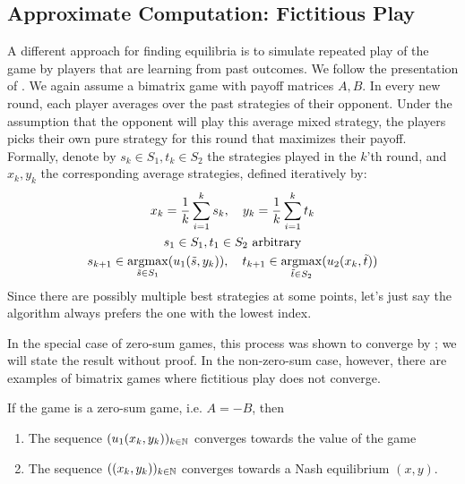\documentclass[a4paper]{scrreprt}
\begin{document}
    \subsection{Approximate Computation: Fictitious Play}
    A different approach for finding equilibria is to simulate repeated play of the game by players that are learning from past outcomes.
    We follow the presentation of \cite{bib:daskalakisFictitiousPlayLectureNotes}.
    We again assume a bimatrix game with payoff matrices $A, B$.
    In every new round, each player averages over the past strategies of their opponent. Under the assumption that the opponent will play this average mixed strategy, the players picks their own pure strategy for this round that maximizes their payoff. Formally, denote by $s_k \in S_1, t_k \in S_2$ the strategies played in the $k$'th round, and $x_k, y_k$ the corresponding average strategies, defined iteratively by:
    \begin{gather*}
        x_k = \frac{1}{k} \sum_{i=1}^{k} s_k, \quad y_k = \frac{1}{k} \sum_{i=1}^{k} t_k \\
        s_1 \in S_1, t_1 \in S_2 \text{ arbitrary} \\
        s_{k+1} \in \mathop{\argmax}\limits_{\tilde{s} \in S_1} (u_1(\tilde{s}, y_k)), \quad %
        t_{k+1} \in \mathop{\argmax}\limits_{\tilde{t} \in S_2} (u_2(x_k, \tilde{t}))
    \end{gather*}
    Since there are possibly multiple best strategies at some points, let's just say the algorithm always prefers the one with the lowest index.
    
    In the special case of zero-sum games, this process was shown to converge by \cite{bib:robinsonFictitiousPlay}; we will state the result without proof.
    In the non-zero-sum case, however, there are examples of bimatrix games where fictitious play does not converge.
    
    \begin{thm}
        \label{thm:fictitiousPlayConverges}
        If the game is a zero-sum game, i.e. $A=-B$, then 
        \begin{enumerate}
            \item The sequence $(u_1(x_k, y_k))_{k \in \mathbb{N}}$ converges towards the value of the game
            \item The sequence $((x_k, y_k))_{k \in \mathbb{N}}$ converges towards a Nash equilibrium $(x, y)$.
        \end{enumerate}
    \end{thm}
\end{document}
